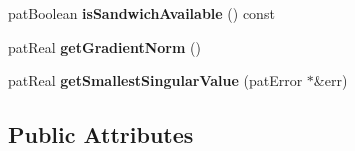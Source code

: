 \begin{DoxyCompactItemize}
\mbox{\label{classbio_optimization_results_a6c9b414a75858121ef804b745eb306f8}} 
pat\+Boolean {\bfseries is\+Sandwich\+Available} () const
\item 
\mbox{\label{classbio_optimization_results_a7233e78780c4c76b2b616cb7fbf78af1}} 
pat\+Real {\bfseries get\+Gradient\+Norm} ()
\item 
\mbox{\label{classbio_optimization_results_a4c0378c4f0331dee3cdb2ecdeb4ad56b}} 
pat\+Real {\bfseries get\+Smallest\+Singular\+Value} (pat\+Error $\ast$\&err)
\end{DoxyCompactItemize}
\subsection*{Public Attributes}
